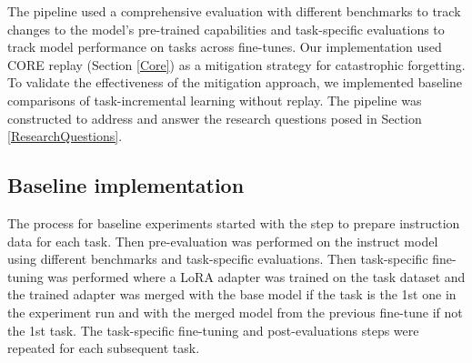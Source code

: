 The pipeline used a comprehensive evaluation with different benchmarks to track changes to the model’s pre-trained capabilities and task-specific evaluations to track model performance on tasks across fine-tunes. Our implementation used CORE replay (Section \ref{Core}) as a mitigation strategy for catastrophic forgetting. To validate the effectiveness of the mitigation approach, we implemented baseline comparisons of task-incremental learning without replay. The pipeline was constructed to address and answer the research questions posed in Section \ref{ResearchQuestions}.

\subsection{Baseline implementation} \label{baseline_setup}
The process for baseline experiments started with the step to prepare instruction data for each task. Then pre-evaluation was performed on the instruct model using different benchmarks and task-specific evaluations. Then task-specific fine-tuning was performed where a LoRA adapter was trained on the task dataset and the trained adapter was merged with the base model if the task is the 1st one in the experiment run and with the merged model from the previous fine-tune if not the 1st task. The task-specific fine-tuning and post-evaluations steps were repeated for each subsequent task.

